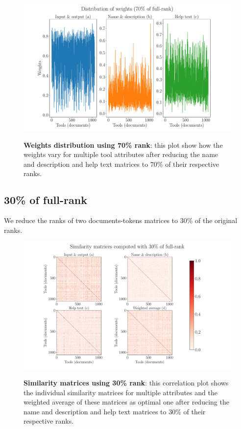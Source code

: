 \begin{figure}[h]
\begin{centering}
    {\includegraphics[scale=0.35]{figures/Weights_070.pdf}}
    \caption[Weights distribution 70\% rank]{\textbf{Weights distribution using 70\% rank}: this plot show how the weights vary for multiple tool attributes after reducing the name and description and help text matrices to 70\% of their respective ranks.}
\end{centering}
\end{figure}


\subsection{30\% of full-rank}
We reduce the ranks of two documents-tokens matrices to 30\% of the original ranks.

\begin{figure}[h]
\begin{centering}
    {\includegraphics[scale=0.35]{figures/Similarity_matrices_030.pdf}}
    \caption[Similarity matrices 30\% rank]{\textbf{Similarity matrices using 30\% rank}: this correlation plot shows the individual similarity matrices for multiple attributes and the weighted average of these matrices as optimal one after reducing the name and description and help text matrices to 30\% of their respective ranks.}
\end{centering}
\end{figure}

